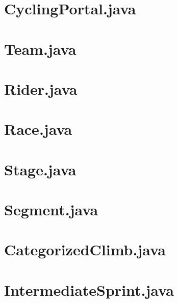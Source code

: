 \documentclass{article}
\begin{document}
\section{CyclingPortal.java}


\section{Team.java}


\section{Rider.java}


\section{Race.java}


\section{Stage.java}


\section{Segment.java}


\section{CategorizedClimb.java}


\section{IntermediateSprint.java}

\end{document}
